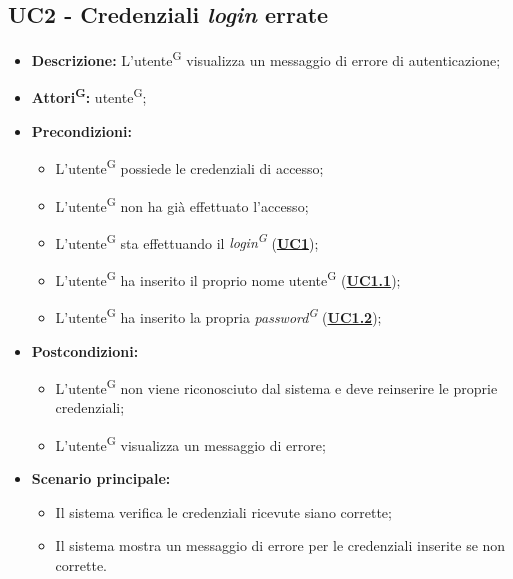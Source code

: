 \subsection{UC2 - Credenziali \textit{login} errate}
\label{sec:UC2}
\begin{itemize}
	\item \textbf{Descrizione:} L’utente\textsuperscript{G} visualizza un messaggio di errore di autenticazione;
	\item \textbf{Attori\textsuperscript{G}:} utente\textsuperscript{G};
	\item \textbf{Precondizioni:} 
	\begin{itemize}
		\item L’utente\textsuperscript{G} possiede le credenziali di accesso;
		\item L’utente\textsuperscript{G} non ha già effettuato l’accesso;
		\item L’utente\textsuperscript{G} sta effettuando il \textit{login\textsuperscript{G}} (\hyperref[sec:UC1]{\textbf{UC1}});
		\item L’utente\textsuperscript{G} ha inserito il proprio nome utente\textsuperscript{G} (\hyperref[sec:UC1.1]{\textbf{UC1.1}});
		\item L’utente\textsuperscript{G} ha inserito la propria \textit{password\textsuperscript{G}} (\hyperref[sec:UC1.2]{\textbf{UC1.2}});
	\end{itemize}
	\item \textbf{Postcondizioni:}
	\begin{itemize}
		\item L’utente\textsuperscript{G} non viene riconosciuto dal sistema e deve reinserire le proprie credenziali;
		\item L'utente\textsuperscript{G}  visualizza un messaggio di errore;
	\end{itemize}
	\item \textbf{Scenario principale:} 
	\begin{itemize}
		\item Il sistema verifica le credenziali ricevute siano corrette;
		\item Il sistema mostra un messaggio di errore per le credenziali inserite se non corrette.
	\end{itemize}
\end{itemize}

